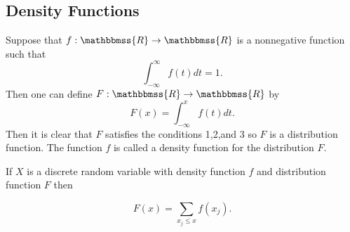 \documentclass[12pt]{article}
\newcommand{\mathbb}[1]{\mathbbmss{#1}}
\begin{document}
\subsection{Density Functions}

Suppose that $f: \mathbb{R} \to \mathbb{R}$ is a nonnegative  function
such that
$$
\int_{-\infty}^\infty f(t)dt=1.
$$
Then one can define $F: \mathbb{R} \to \mathbb{R}$ by
$$
F(x) = \int_{-\infty}^x f(t)dt.
$$
Then it is clear that $F$ satisfies the conditions 1,2,and 3 so $F$ 
is a distribution function. The function $f$ is called a density function
for the distribution $F$.

If $X$ is a discrete random variable with density function $f$ and distribution 
function $F$ then

$$F(x)=\sum_{x_j\leq x} f(x_j).$$




\end{document}

